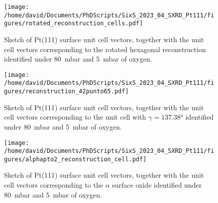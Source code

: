 

\begin{figure}[!htb]
    \centering
    \texttt{[image: /home/david/Documents/PhDScripts/SixS\_2023\_04\_SXRD\_Pt111/figures/rotated\_reconstruction\_cells.pdf]}
    \caption{
    Sketch of Pt(111) surface unit cell vectors, together with the unit cell vectors corresponding to the rotated hexagonal reconstruction identified under \qty{80}{\milli\bar} and \qty{5}{\milli\bar} of oxygen.
    }
    \label{fig:Pt111UnitCellsRotated}
\end{figure}

\begin{figure}[!htb]
    \centering
    \texttt{[image: /home/david/Documents/PhDScripts/SixS\_2023\_04\_SXRD\_Pt111/figures/reconstruction\_42punto65.pdf]}
    \caption{
    Sketch of Pt(111) surface unit cell vectors, together with the unit cell vectors corresponding to the unit cell with $\gamma=\ang{137.38}$ identified under \qty{80}{\milli\bar} and \qty{5}{\milli\bar} of oxygen.
    }
    \label{fig:Pt111UnitCellsReconstruction}
\end{figure}

\begin{figure}[!htb]
    \centering
    \texttt{[image: /home/david/Documents/PhDScripts/SixS\_2023\_04\_SXRD\_Pt111/figures/alphapto2\_reconstruction\_cell.pdf]}
    \caption{
    Sketch of Pt(111) surface unit cell vectors, together with the unit cell vectors corresponding to the $\alpha$ surface oxide  identified under \qty{80}{\milli\bar} and \qty{5}{\milli\bar} of oxygen.
    }
    \label{fig:Pt111AlphaPtO2}
\end{figure}


